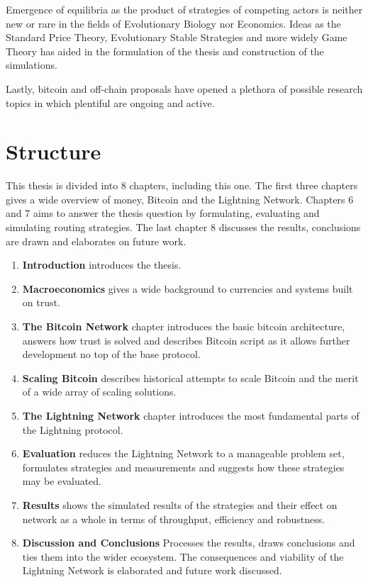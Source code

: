	Emergence of equilibria as the product of strategies of competing actors is neither new or rare in the fields of Evolutionary Biology nor Economics. Ideas as the Standard Price Theory, Evolutionary Stable Strategies and more widely Game Theory has aided in the formulation of the thesis and construction of the simulations.
	
	Lastly, \gls{bitcoin} and off-chain proposals have opened a plethora of possible research topics in which plentiful are ongoing and active.  
	
	
\section{Structure}

This thesis is divided into 8 chapters, including this one. The first three chapters gives a wide overview of money, Bitcoin and the \gls{Lightning Network}. Chapters 6 and 7 aims to answer the thesis question by formulating, evaluating and simulating routing strategies. The last chapter 8 discusses the results, conclusions are drawn and elaborates on future work.

\begin{enumerate}
	\item \textbf{Introduction} introduces the thesis.
	\item \textbf{Macroeconomics} gives a wide background to currencies and systems built on trust. 
	\item \textbf{The Bitcoin Network} chapter introduces the basic \gls{bitcoin} architecture, answers how trust is solved and describes Bitcoin script as it allows further development no top of the base protocol.
	\item \textbf{Scaling Bitcoin} describes historical attempts to scale Bitcoin and the merit of a wide array of scaling solutions.
	\item \textbf{The \gls{Lightning Network}} chapter introduces the most fundamental parts of the Lightning protocol.
	\item \textbf{Evaluation} reduces the Lightning Network to a manageable problem set, formulates strategies and measurements and suggests how these strategies may be evaluated.
	\item \textbf{Results} shows the simulated results of the strategies and their effect on network as a whole in terms of throughput, efficiency and robustness.
	\item \textbf{Discussion and Conclusions} Processes the results, draws conclusions and ties them into the wider ecosystem. The consequences and viability of the Lightning Network is elaborated and future work discussed.
\end{enumerate}